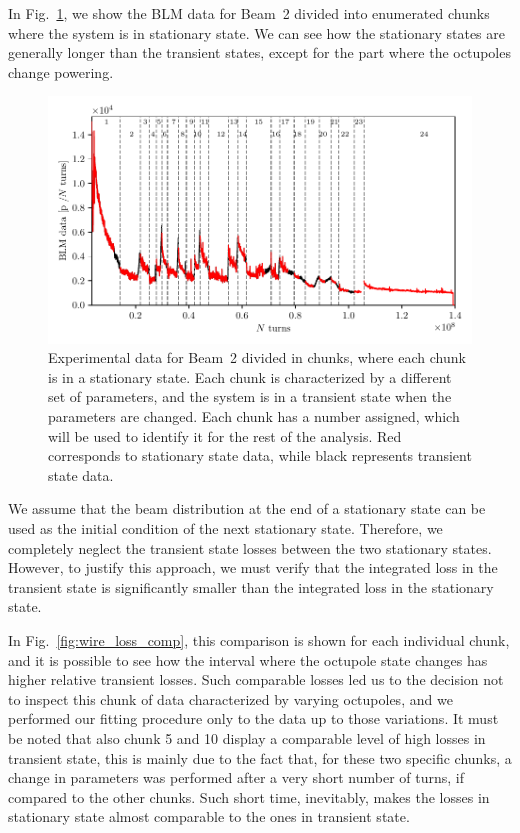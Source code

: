 In Fig.~\ref{fig:chunks}, we show the BLM data for Beam~2 divided into enumerated chunks where the system is in stationary state. We can see how the stationary states are generally longer than the transient states, except for the part where the octupoles change powering.

\begin{figure}[hpt]
    \centering
    \includegraphics[width=1.0\textwidth]{5_wire_compensators_LHC/figs/chunks_names.pdf}
    \caption{Experimental data for Beam~2 divided in chunks, where each chunk is in a stationary state. Each chunk is characterized by a different set of parameters, and the system is in a transient state when the parameters are changed. Each chunk has a number assigned, which will be used to identify it for the rest of the analysis. Red corresponds to stationary state data, while black represents transient state data.}
    \label{fig:chunks}
\end{figure}

We assume that the beam distribution at the end of a stationary state can be used as the initial condition of the next stationary state. Therefore, we completely neglect the transient state losses between the two stationary states. However, to justify this approach, we must verify that the integrated loss in the transient state is significantly smaller than the integrated loss in the stationary state.

In Fig.~\ref{fig:wire_loss_comp}, this comparison is shown for each individual chunk, and it is possible to see how the interval where the octupole state changes has higher relative transient losses. Such comparable losses led us to the decision not to inspect this chunk of data characterized by varying octupoles, and we performed our fitting procedure only to the data up to those variations. It must be noted that also chunk 5 and 10 display a comparable level of high losses in transient state, this is mainly due to the fact that, for these two specific chunks, a change in parameters was performed after a very short number of turns, if compared to the other chunks. Such short time, inevitably, makes the losses in stationary state almost comparable to the ones in transient state. 

